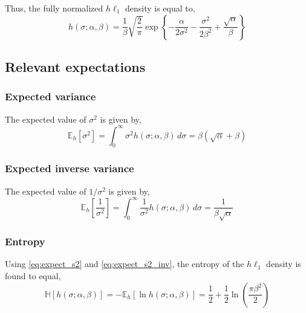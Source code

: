 \documentclass{article}
\newcommand{\E}[2]{\mathbb{E}_{#2}\left[ #1 \right]}
\begin{document}
Thus, the fully normalized $h\ell_1$ density is equal to,
\begin{equation}
h(\sigma; \alpha, \beta) =
 \frac{1}{\beta} \sqrt{\frac{2}{\pi}}
 \exp\left\{
  -\frac{\alpha}{2 \sigma^2}
  -\frac{\sigma^2}{2 \beta^2}
  +\frac{\sqrt{\alpha}}{\beta}
 \right\}
\label{eq:hprior_norm}
\end{equation}

\subsection{Relevant expectations}
\subsubsection{Expected variance}
The expected value of $\sigma^2$ is given by,
\begin{equation}
\E{\sigma^2}{h} =
 \int_0^\infty \sigma^2 h(\sigma; \alpha, \beta) \, d\sigma =
 \beta (\sqrt{\alpha} + \beta)
\label{eq:expect_s2}
\end{equation}

\subsubsection{Expected inverse variance}
The expected value of $1 / \sigma^2$ is given by,
\begin{equation}
\E{\frac{1}{\sigma^2}}{h} =
 \int_0^\infty \frac{1}{\sigma^2} h(\sigma; \alpha, \beta) \, d\sigma =
 \frac{1}{\beta \sqrt{\alpha}}
\label{eq:expect_s2_inv}
\end{equation}

\subsubsection{Entropy}
Using \eqref{eq:expect_s2} and \eqref{eq:expect_s2_inv}, the entropy
of the $h\ell_1$ density is found to equal,
\begin{equation}
\mathbb{H}[h(\sigma; \alpha, \beta)] =
 -\E{\ln h(\sigma; \alpha, \beta)}{h} =
 \frac{1}{2} + \frac{1}{2} \ln\left( \frac{\pi \beta^2}{2} \right)
\label{eq:hprior_entropy}
\end{equation}

\end{document}

